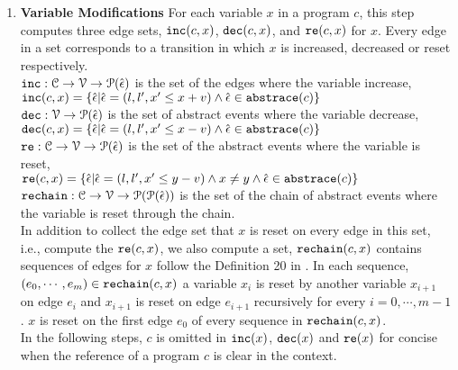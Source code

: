 \begin{enumerate}
\item \textbf{Variable Modifications}
For each variable $x$ in a program $c$, this step computes three edge sets, $\mathtt{inc}(c, x)$, $\mathtt{dec}(c, x)$,
and $\mathtt{re}(c, x)$ for $x$.
Every edge in a set corresponds to a transition in which $x$ is increased,
decreased
or reset
respectively.
\\
$\mathtt{inc}: \mathcal{C} \to \mathcal{V} \to \mathcal{P}(\hat{\mathtt{\epsilon}{}}) $
is the set of the edges where the variable increase, 
\\
$\mathtt{inc}(c, x) = \{ \hat{\mathtt{\epsilon}{}} | \hat{\mathtt{\epsilon}{}} = (l, l', x' \leq x + v) \land \hat{\mathtt{\epsilon}{}} \in \mathtt{abs}{\mathtt{trace}}(c)\}$
\\
$\mathtt{dec}: \mathcal{V} \to \mathcal{P}(\hat{\mathtt{\epsilon}{}}) $
is the set of abstract events where the variable decrease,
\\
$\mathtt{dec}(c, x) = \{\hat{\mathtt{\epsilon}{}}| \hat{\mathtt{\epsilon}{}} = (l, l', x' \leq x - v) \land \hat{\mathtt{\epsilon}{}} \in \mathtt{abs}{\mathtt{trace}}(c)\}$
\\
$\mathtt{re}: \mathcal{C} \to \mathcal{V} \to \mathcal{P}(\hat{\mathtt{\epsilon}{}}) $
is the set of the abstract events where the variable is reset,
\\
$\mathtt{re}(c, x) = \{\hat{\mathtt{\epsilon}{}}| \hat{\mathtt{\epsilon}{}} = (l, l', x' \leq y - v) \land x \neq y \land \hat{\mathtt{\epsilon}{}} \in \mathtt{abs}{\mathtt{trace}}(c)\}$
\\
$\mathtt{rechain}: \mathcal{C} \to \mathcal{V} \to \mathcal{P}(\mathcal{P}(\hat{\mathtt{\epsilon}{}})) $
is the set of the chain of abstract events where the variable is reset through the chain.
\\
In addition to
collect the edge set that $x$ is reset on every edge in this set, i.e., compute the $\mathtt{re}(c, x)$,
we also compute a set, $\mathtt{rechain}(c, x)$ contains sequences of edges for $x$
follow the Definition 20 in \cite{sinn2017complexity}.
In each sequence, $(e_0, \cdots, e_m) \in \mathtt{rechain}(c, x)$
a variable $x_i$ is reset by another variable $x_{i + 1}$ on edge $e_{i}$
and $x_{i + 1}$ is reset on edge $e_{i + 1}$ recursively
for every $i = 0, \cdots, m - 1$.
$x$ is reset on the first edge $e_0$ of every sequence in $\mathtt{rechain}(c, x)$.
%
\\
In the following steps, $c$ is omitted in $\mathtt{inc}(x)$,
$\mathtt{dec}(x)$ and $\mathtt{re}(x)$ for concise when the reference of a program $c$ is clear in the context.

\end{enumerate}

